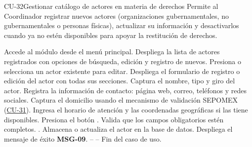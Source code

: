 \begin{UseCase}{CU-32}{Gestionar catálogo de actores en materia de derechos}{
	Permite al Coordinador registrar nuevos actores (organizaciones gubernamentales, no gubernamentales o personas físicas), actualizar su información y desactivarlos cuando ya no estén disponibles para apoyar la restitución de derechos.
}
\end{UseCase}

\begin{UCtrayectoria}
	\UCpaso[\UCactor] Accede al módulo  desde el menú principal.
	\UCpaso Despliega la lista de actores registrados con opciones de búsqueda, edición y registro de nuevos.
	\UCpaso[\UCactor] Presiona  o selecciona un actor existente para editar.
	\UCpaso Despliega el formulario de registro o edición del actor con todas sus secciones.
	\UCpaso[\UCactor] Captura el nombre, tipo y giro del actor.
	\UCpaso[\UCactor] Registra la información de contacto: página web, correo, teléfonos y redes sociales.
	\UCpaso[\UCactor] Captura el domicilio usando el mecanismo de validación SEPOMEX (\hyperlink{CU-31}{CU-31}).
	\UCpaso[\UCactor] Ingresa el horario de atención y las coordenadas geográficas si las tiene disponibles.
	\UCpaso[\UCactor] Presiona el botón .
	\UCpaso Valida que los campos obligatorios estén completos. .
	\UCpaso Almacena o actualiza el actor en la base de datos.
	\UCpaso Despliega el mensaje de éxito \textbf{MSG-09}.
	\UCpaso[] -- -- Fin del caso de uso.
\end{UCtrayectoria}

